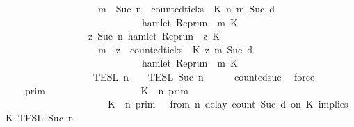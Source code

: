\begin{isabellebody}
\ \ \ \ \ \ \ \ \ \ \ \ \ \ \ \ \ \ \ \ {\isacharparenleft}{\isasymforall}m\ {\isasymge}\ Suc\ n{\isachardot}\ \ counted{\isacharunderscore}ticks\ {\isasymrho}\ K\ n\ m\ {\isacharparenleft}Suc\ d{\isacharparenright}\isanewline
\ \ \ \ \ \ \ \ \ \ \ \ \ \ \ \ \ \ \ \ \ \ \ \ \ \ \ \ {\isasymlongrightarrow}\ hamlet\ {\isacharparenleft}{\isacharparenleft}Rep{\isacharunderscore}run\ {\isasymrho}{\isacharparenright}\ m\ K\ {\isacharbraceright}{\isacharparenright}\isanewline
\ \ \ \ \ \ \ \ \ \ \ \ \ \ \ \ {\isasyminter}\ {\isacharbraceleft}{\isasymrho}{\isachardot}\ {\isasymforall}z{\isasymge}\ Suc\ n{\isachardot}\ hamlet\ {\isacharparenleft}{\isacharparenleft}Rep{\isacharunderscore}run\ {\isasymrho}{\isacharparenright}\ z\ K\ {\isasymlongrightarrow}\isanewline
\ \ \ \ \ \ \ \ \ \ \ \ \ \ \ \ \ \ \ \ {\isacharparenleft}{\isasymforall}m\ {\isasymge}\ z{\isachardot}\ \ counted{\isacharunderscore}ticks\ {\isasymrho}\ K\ z\ m\ {\isacharparenleft}Suc\ d{\isacharparenright}\isanewline
\ \ \ \ \ \ \ \ \ \ \ \ \ \ \ \ \ \ \ \ \ \ \ \ \ \ \ \ {\isasymlongrightarrow}\ hamlet\ {\isacharparenleft}{\isacharparenleft}Rep{\isacharunderscore}run\ {\isasymrho}{\isacharparenright}\ m\ K\ {\isacharbraceright}\isanewline
\ \ \ \ \ \ \ \ \ \ \ \ \ \ \ \ {\isasyminter}\ {\isasymlbrakk}{\isasymlbrakk}\ {\isasymPsi}\ {\isasymrbrakk}{\isasymrbrakk}\isactrlsub T\isactrlsub E\isactrlsub S\isactrlsub L\isactrlbsup {\isasymge}\ n\isactrlesup \ {\isasyminter}\ {\isasymlbrakk}{\isasymlbrakk}\ {\isasymPhi}\ {\isasymrbrakk}{\isasymrbrakk}\isactrlsub T\isactrlsub E\isactrlsub S\isactrlsub L\isactrlbsup {\isasymge}\ Suc\ n\isactrlesup {\isacartoucheclose}\isanewline
\ \ \ \ \isamarkupfalse%
\ counted{\isacharunderscore}suc\ \isamarkupfalse%
\ force\isanewline
\ \ \isamarkupfalse%
\ \isamarkupfalse%
\ {\isacartoucheopen}{\isachardot}{\isachardot}{\isachardot}\ {\isacharequal}\ {\isasymlbrakk}{\isasymlbrakk}\ {\isasymGamma}\ {\isasymrbrakk}{\isasymrbrakk}\isactrlsub p\isactrlsub r\isactrlsub i\isactrlsub m\ \isanewline
\ \ \ \ \ \ \ \ \ \ \ \ \ \ \ \ {\isasyminter}\ {\isacharparenleft}{\isasymlbrakk}\ K\ {\isasymnot}{\isasymUp}\ n\ {\isasymrbrakk}\isactrlsub p\isactrlsub r\isactrlsub i\isactrlsub m\isanewline
\ \ \ \ \ \ \ \ \ \ \ \ \ \ \ \ \ \ \ \ {\isasymunion}\ {\isacharparenleft}{\isasymlbrakk}\ K\ {\isasymUp}\ n\ {\isasymrbrakk}\isactrlsub p\isactrlsub r\isactrlsub i\isactrlsub m\ {\isasyminter}\ {\isasymlbrakk}\ from\ n\ delay\ count\ {\isacharparenleft}Suc\ d{\isacharparenright}\ on\ K\ implies\ K\ {\isasymrbrakk}\isactrlsub T\isactrlsub E\isactrlsub S\isactrlsub L\isactrlbsup {\isasymge}\ Suc\ n\isactrlesup {\isacharparenright}\isanewline

\end{isabellebody}
